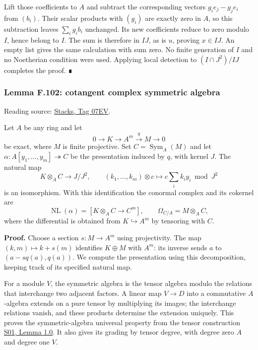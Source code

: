\documentclass[11pt,a4paper,openany]{report}
\begin{document}
Lift those coefficients to \(A\) and subtract the corresponding vectors \(g_i e_j-g_j e_i\) from \((b_i)\). Their scalar products with \((g_i)\) are exactly zero in \(A\), so this subtraction leaves \(\sum_i g_i b_i\) unchanged. Its new coefficients reduce to zero modulo \(I\), hence belong to \(I\). The sum is therefore in \(IJ\), as is \(u\), proving \(x\in IJ\). An empty list gives the same calculation with sum zero. No finite generation of \(I\) and no Noetherian condition were used. Applying local detection to \((I\cap J^2)/IJ\) completes the proof. ∎

\label{AG-RG-S05-more-algebra-lemma-cotangent-complex-symmetric-algebra}

\subsubsection{Lemma F.102: cotangent complex symmetric algebra}\label{AG-RG-S05-lemma-f.102-cotangent-complex-symmetric-algebra}

Reading source: \href{https://stacks.math.columbia.edu/tag/07EV}{Stacks, Tag 07EV}.

Let \(A\) be any ring and let \[
0\longrightarrow K\longrightarrow A^m\xrightarrow{q}M\longrightarrow0
\] be exact, where \(M\) is finite projective. Set \(C=\operatorname{Sym}_A(M)\) and let \(\alpha:A[y_1,\ldots,y_m]\twoheadrightarrow C\) be the presentation induced by \(q\), with kernel \(J\). The natural map \[
K\otimes_A C\longrightarrow J/J^2,
\qquad (k_1,\ldots,k_m)\otimes c
\longmapsto c\sum_i k_i y_i\bmod J^2
\] is an isomorphism. With this identification the conormal complex and its cokernel are \[
\operatorname{NL}(\alpha)=[K\otimes_A C\longrightarrow C^m],
\qquad \Omega_{C/A}=M\otimes_A C,
\] where the differential is obtained from \(K\hookrightarrow A^m\) by tensoring with \(C\).

\textbf{Proof.} Choose a section \(s:M\to A^m\) using projectivity. The map \((k,m)\mapsto k+s(m)\) identifies \(K\oplus M\) with \(A^m\): its inverse sends \(a\) to \((a-sq(a),q(a))\). We compute the presentation using this decomposition, keeping track of its specified natural map.

For a module \(V\), the symmetric algebra is the tensor algebra modulo the relations that interchange two adjacent factors. A linear map \(V\to D\) into a commutative \(A\)-algebra extends on a pure tensor by multiplying its images; the interchange relations vanish, and these products determine the extension uniquely. This proves the symmetric-algebra universal property from the tensor construction \href{https://github.com/KokunoYumeto/open-math-courses/blob/main/docs/courses/AG-RG/AG-RG-S01.md}{S01, Lemma 1.0}. It also gives its grading by tensor degree, with degree zero \(A\) and degree one \(V\).
\end{document}
